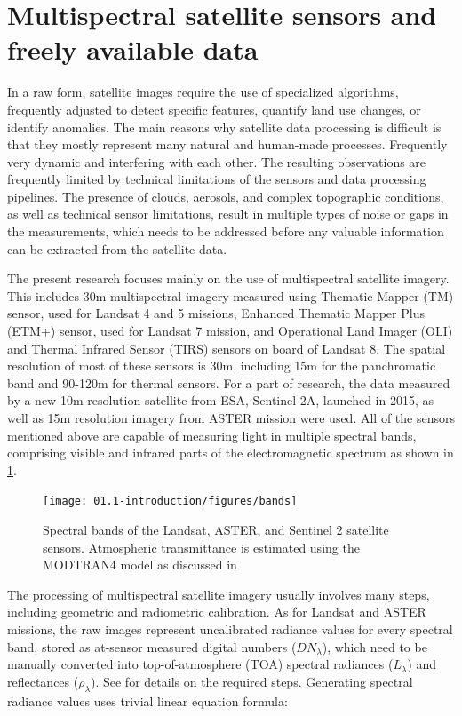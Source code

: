 \section{Multispectral satellite sensors and freely available data}

In a raw form, satellite images require the use of specialized algorithms, frequently adjusted to detect specific features, quantify land use changes, or identify anomalies. The main reasons why satellite data processing is difficult is that they mostly represent many natural and human-made processes. Frequently very dynamic and interfering with each other. The resulting observations are frequently limited by technical limitations of the sensors and data processing pipelines. The presence of clouds, aerosols, and complex topographic conditions, as well as technical sensor limitations, result in multiple types of noise or gaps in the measurements, which needs to be addressed before any valuable information can be extracted from the satellite data.

The present research focuses mainly on the use of multispectral satellite imagery. This includes 30m multispectral imagery measured using Thematic Mapper (TM) sensor, used for Landsat 4 and 5 missions, Enhanced Thematic Mapper Plus (ETM+) sensor, used for Landsat 7 mission, and Operational Land Imager (OLI) and Thermal Infrared Sensor (TIRS) sensors on board of Landsat 8. The spatial resolution of most of these sensors is 30m, including 15m for the panchromatic band and 90-120m for thermal sensors. For a part of research, the data measured by a new 10m resolution satellite from ESA, Sentinel 2A, launched in 2015, as well as 15m resolution imagery from ASTER mission \citep{REF} were used.  All of the sensors mentioned above are capable of measuring light in multiple spectral bands, comprising visible and infrared parts of the electromagnetic spectrum as shown in \ref{fig:sensor-bands}.

\begin{figure}
	\texttt{[image: 01.1-introduction/figures/bands]}
	\caption{Spectral bands of the Landsat, ASTER, and Sentinel 2 satellite sensors. Atmospheric transmittance is estimated using the MODTRAN4 model as discussed in \citep{verhoef2003simulation}}
	\label{fig:sensor-bands}
\end{figure}

The processing of multispectral satellite imagery usually involves many steps, including geometric and radiometric calibration. As for Landsat and ASTER missions, the raw images represent uncalibrated radiance values for every spectral band, stored as at-sensor measured digital numbers ($DN_\lambda$), which need to be manually converted into top-of-atmosphere (TOA) spectral radiances ($L_\lambda$) and reflectances ($\rho_\lambda$). See \citep{chander2009summary} for details on the required steps. Generating spectral radiance values uses trivial linear equation formula:

